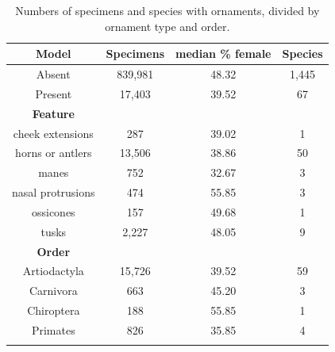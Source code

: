 \documentclass[a4paper, 12pt]{article}
\begin{document}
\begin{table}[H]
\centering
\begin{tabular}{cccc}
 
  \hline
  \textbf{Model} & \textbf{Specimens} & \textbf{median \% female} & \textbf{Species}\\ 
  \hline
  Absent & 839,981 & 48.32 & 1,445\\
  Present & 17,403 & 39.52 & 67\\
  \hline
  \textbf{Feature} &&&\\
  \hline
  cheek extensions & 287 & 39.02 & 1\\
  horns or antlers & 13,506 & 38.86 & 50\\
  manes & 752 & 32.67 & 3\\
  nasal protrusions & 474 & 55.85 & 3\\
  ossicones & 157 & 49.68 & 1\\
  tusks & 2,227 & 48.05 & 9\\
  \hline
  \textbf{Order} &&&\\
  \hline
  Artiodactyla & 15,726 & 39.52 & 59\\
  Carnivora & 663 & 45.20 & 3\\
  Chiroptera & 188 & 55.85 & 1\\
  Primates & 826 & 35.85 & 4\\
  \hline

\label{table_orn_numbers}
\end{tabular}
\caption{Numbers of specimens and species with ornaments, divided by ornament type and order.} 
\end{table}

\newpage


\end{document}
